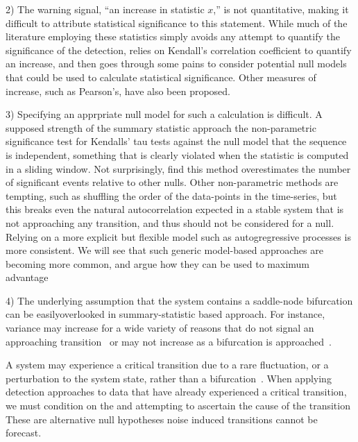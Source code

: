 \documentclass[authoryear,preprint,11pt]{elsarticle}
\begin{document}
2) The warning signal, ``an increase in statistic $x$,'' is not quantitative,
making it difficult to attribute statistical significance to this statement.
While much of the literature employing these statistics simply avoids 
any attempt to quantify the significance of the detection, 
\citet{Dakos2008} relies on Kendall's correlation coefficient to quantify an increase,
and then goes through some pains to consider potential null models
that could be used to calculate statistical significance.  
Other measures of increase, such as Pearson's, have also been proposed.  

3) Specifying an apprpriate null model for such a calculation is difficult.  
A supposed strength of the summary statistic approach 
the non-parametric significance test for Kendalls' tau tests against the null model that the sequence is independent,
something that is clearly violated when the statistic is computed in a sliding window.
Not surprisingly, \citet{Dakos2008} find this method overestimates the number of significant events relative to other nulls.  
Other non-parametric methods are tempting, 
such as shuffling the order of the data-points in the time-series,
but this breaks even the natural autocorrelation expected in a stable system that is not approaching any transition,
and thus should not be considered for a null.  
Relying on a more explicit but flexible model %
such as autogregressive processes is more consistent.  
We will see that such generic model-based approaches are becoming more common, 
and argue how they can be used to maximum advantage



4) The underlying assumption that the system contains a saddle-node bifurcation
can be easilyoverlooked in summary-statistic based approach.  
For instance, variance may increase for a wide variety of reasons that 
do not signal an approaching transition~\citep{Schreiber2003, Schreiber2008} 
or may not increase as a bifurcation is approached~\citep{Livnia2012, Dakos2011a}.


A system may experience a critical transition due to a rare fluctuation,
or a perturbation to the system state, %
rather than a bifurcation~\citep{Scheffer2001, Scheffer2009}.  
When applying detection approaches to data that have already experienced a critical transition,
we must condition on the 
and attempting to ascertain the cause of the transition
These are alternative null hypotheses 
\citep{Ditlevsen2010} %
\citep{Livina2011} noise induced transitions cannot be forecast.  
\end{document}
